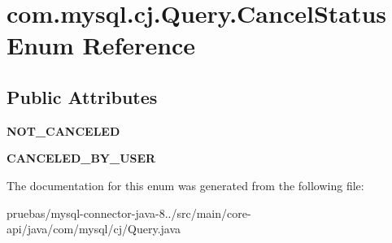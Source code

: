 \hypertarget{enumcom_1_1mysql_1_1cj_1_1_query_1_1_cancel_status}{}\section{com.\+mysql.\+cj.\+Query.\+Cancel\+Status Enum Reference}
\label{enumcom_1_1mysql_1_1cj_1_1_query_1_1_cancel_status}
\subsection*{Public Attributes}
\begin{DoxyCompactItemize}
\item 
\mbox{\label{enumcom_1_1mysql_1_1cj_1_1_query_1_1_cancel_status_ad749d0879dbc21cb3be4cbf52b7a2dd4}} 
{\bfseries N\+O\+T\+\_\+\+C\+A\+N\+C\+E\+L\+ED}
\item 
\mbox{\label{enumcom_1_1mysql_1_1cj_1_1_query_1_1_cancel_status_af49bd3ca16a64312011565373552f3a6}} 
{\bfseries C\+A\+N\+C\+E\+L\+E\+D\+\_\+\+B\+Y\+\_\+\+U\+S\+ER}
\end{DoxyCompactItemize}


The documentation for this enum was generated from the following file\+:\begin{DoxyCompactItemize}
\item 
pruebas/mysql-\/connector-\/java-\/8../src/main/core-\/api/java/com/mysql/cj/Query.\+java\end{DoxyCompactItemize}
